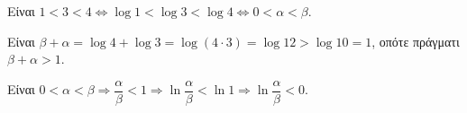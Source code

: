 \begin{alist}
\item Είναι $1 < 3 < 4 \Leftrightarrow \log 1 < \log 3 < \log 4 \Leftrightarrow 0 < \alpha < \beta$.
\item 
\begin{rlist}
\item Είναι $\beta + \alpha = \log 4 + \log 3 = \log(4 \cdot 3) = \log 12 > \log 10 = 1$, οπότε πράγματι $\beta + \alpha > 1$.
\item Είναι $0 < \alpha < \beta \Rightarrow \dfrac{\alpha}{\beta} < 1 \Rightarrow \ln\dfrac{\alpha}{\beta} < \ln 1 \Rightarrow \ln\dfrac{\alpha}{\beta} < 0$.
\end{rlist}
\end{alist}

